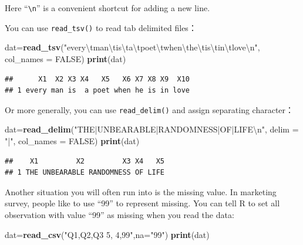 \documentclass[]{book}
\newenvironment{Shaded}{\begin{snugshade}}{\end{snugshade}}
\newcommand{\KeywordTok}[1]{\textcolor[rgb]{0.13,0.29,0.53}{\textbf{{#1}}}}
\newcommand{\DataTypeTok}[1]{\textcolor[rgb]{0.13,0.29,0.53}{{#1}}}
\newcommand{\CharTok}[1]{\textcolor[rgb]{0.31,0.60,0.02}{{#1}}}
\newcommand{\StringTok}[1]{\textcolor[rgb]{0.31,0.60,0.02}{{#1}}}
\newcommand{\OtherTok}[1]{\textcolor[rgb]{0.56,0.35,0.01}{{#1}}}
\newcommand{\NormalTok}[1]{{#1}}
\theoremstyle{definition}
\theoremstyle{definition}
\theoremstyle{remark}
\begin{document}
Here ``\texttt{\textbackslash{}n}'' is a convenient shortcut for adding
a new line.

You can use \texttt{read\_tsv()} to read tab delimited files：

\begin{Shaded}
\begin{Highlighting}[]
\NormalTok{dat=}\KeywordTok{read_tsv}\NormalTok{(}\StringTok{"every}\CharTok{\textbackslash{}t}\StringTok{man}\CharTok{\textbackslash{}t}\StringTok{is}\CharTok{\textbackslash{}t}\StringTok{a}\CharTok{\textbackslash{}t}\StringTok{poet}\CharTok{\textbackslash{}t}\StringTok{when}\CharTok{\textbackslash{}t}\StringTok{he}\CharTok{\textbackslash{}t}\StringTok{is}\CharTok{\textbackslash{}t}\StringTok{in}\CharTok{\textbackslash{}t}\StringTok{love}\CharTok{\textbackslash{}n}\StringTok{"}\NormalTok{, }\DataTypeTok{col_names =} \OtherTok{FALSE}\NormalTok{)}
\KeywordTok{print}\NormalTok{(dat)}
\end{Highlighting}
\end{Shaded}

\begin{verbatim}
##      X1  X2 X3 X4   X5   X6 X7 X8 X9  X10
## 1 every man is  a poet when he is in love
\end{verbatim}

Or more generally, you can use \texttt{read\_delim()} and assign
separating character：

\begin{Shaded}
\begin{Highlighting}[]
\NormalTok{dat=}\KeywordTok{read_delim}\NormalTok{(}\StringTok{"THE|UNBEARABLE|RANDOMNESS|OF|LIFE}\CharTok{\textbackslash{}n}\StringTok{"}\NormalTok{, }\DataTypeTok{delim =} \StringTok{"|"}\NormalTok{, }\DataTypeTok{col_names =} \OtherTok{FALSE}\NormalTok{)}
\KeywordTok{print}\NormalTok{(dat)}
\end{Highlighting}
\end{Shaded}

\begin{verbatim}
##    X1         X2         X3 X4   X5
## 1 THE UNBEARABLE RANDOMNESS OF LIFE
\end{verbatim}

Another situation you will often run into is the missing value. In
marketing survey, people like to use ``99'' to represent missing. You
can tell R to set all observation with value ``99'' as missing when you
read the data:

\begin{Shaded}
\begin{Highlighting}[]
\NormalTok{dat=}\KeywordTok{read_csv}\NormalTok{(}\StringTok{"Q1,Q2,Q3}
\StringTok{               5, 4,99"}\NormalTok{,}\DataTypeTok{na=}\StringTok{"99"}\NormalTok{)}
\KeywordTok{print}\NormalTok{(dat)}
\end{Highlighting}
\end{Shaded}
\end{document}
